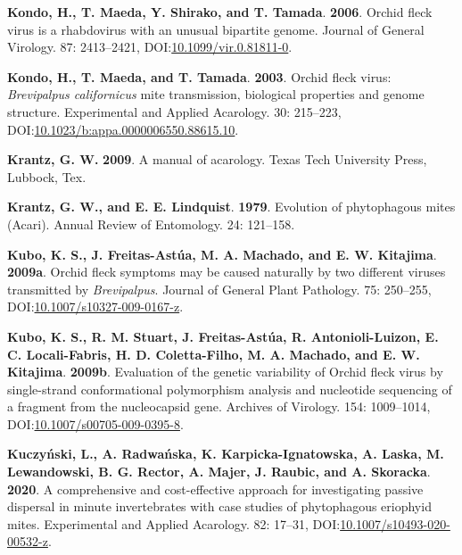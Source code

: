 \documentclass[12pt,final,CPage]{ufthesis}
\newlength{\cslhangindent}
\newenvironment{CSLReferences}[2] %
{%
	\setlength{\parindent}{0pt}
	\ifodd #1 \everypar{\setlength{\hangindent}{\cslhangindent}}\ignorespaces\fi
	\ifnum #2 > 0
	\setlength{\parskip}{#2\baselineskip}
	\fi
}%
{}
\begin{document}
{\begin{CSLReferences}{1}{0}
  \leavevmode{}%
  \textbf{Kondo, H., T. Maeda, Y. Shirako, and T. Tamada}. \textbf{2006}. {Orchid fleck virus} is a rhabdovirus with an unusual bipartite genome. Journal of General Virology. 87: 2413--2421, DOI:\href{https://doi.org/10.1099/vir.0.81811-0}{10.1099/vir.0.81811-0}.

  \leavevmode{}%
  \textbf{Kondo, H., T. Maeda, and T. Tamada}. \textbf{2003}. {Orchid fleck virus}: {\emph{Brevipalpus californicus}} mite transmission, biological properties and genome structure. Experimental and Applied Acarology. 30: 215--223, DOI:\href{https://doi.org/10.1023/b:appa.0000006550.88615.10}{10.1023/b:appa.0000006550.88615.10}.

  \leavevmode{}%
  \textbf{Krantz, G. W.} \textbf{2009}. A manual of acarology. Texas Tech University Press, Lubbock, Tex.

  \leavevmode{}%
  \textbf{Krantz, G. W., and E. E. Lindquist}. \textbf{1979}. Evolution of phytophagous mites ({Acari}). Annual Review of Entomology. 24: 121--158.

  \leavevmode{}%
  \textbf{Kubo, K. S., J. Freitas-Astúa, M. A. Machado, and E. W. Kitajima}. \textbf{2009a}. {Orchid fleck} symptoms may be caused naturally by two different viruses transmitted by {\emph{Brevipalpus}}. Journal of General Plant Pathology. 75: 250--255, DOI:\href{https://doi.org/10.1007/s10327-009-0167-z}{10.1007/s10327-009-0167-z}.

  \leavevmode{}%
  \textbf{Kubo, K. S., R. M. Stuart, J. Freitas-Astúa, R. Antonioli-Luizon, E. C. Locali-Fabris, H. D. Coletta-Filho, M. A. Machado, and E. W. Kitajima}. \textbf{2009b}. Evaluation of the genetic variability of {Orchid fleck virus} by single-strand conformational polymorphism analysis and nucleotide sequencing of a fragment from the nucleocapsid gene. Archives of Virology. 154: 1009--1014, DOI:\href{https://doi.org/10.1007/s00705-009-0395-8}{10.1007/s00705-009-0395-8}.

  \leavevmode{}%
  \textbf{Kuczyński, L., A. Radwańska, K. Karpicka-Ignatowska, A. Laska, M. Lewandowski, B. G. Rector, A. Majer, J. Raubic, and A. Skoracka}. \textbf{2020}. A comprehensive and cost-effective approach for investigating passive dispersal in minute invertebrates with case studies of phytophagous eriophyid mites. Experimental and Applied Acarology. 82: 17--31, DOI:\href{https://doi.org/10.1007/s10493-020-00532-z}{10.1007/s10493-020-00532-z}.


\end{CSLReferences}}
\end{document}
